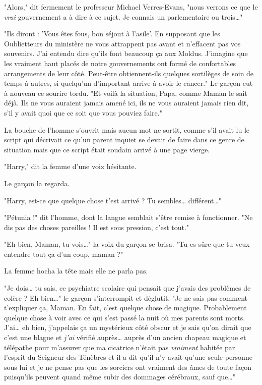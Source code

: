 "Alors," dit fermement le professeur Michael Verres-Evans, "nous verrons ce que le \emph{vrai}  gouvernement a à dire à ce sujet. Je connais un parlementaire ou trois…"

"Ils diront : 'Vous êtes fous, bon séjout à l'asile'. En supposant que les Oublietteurs du ministère ne vous attrappent pas avant et n'effacent pas vos souvenirs. J'ai entendu dire qu'ils font beaucoup ça aux Moldus. J'imagine que les vraiment haut placés de notre gouvernements ont formé de confortables arrangements de leur côté. Peut-être obtiennent-ils quelques sortilèges de soin de temps à autres, si quelqu'un d'important arrive à avoir le cancer." Le garçon eut à nouveau ce sourire tordu. "Et voilà la situation, Papa, comme Maman le sait déjà. Ils ne vous auraient jamais amené ici, ils ne vous auraient jamais rien dit, s'il y avait quoi que ce soit que vous pouviez faire."

La bouche de l'homme s'ouvrit mais aucun mot ne sortit, comme s'il avait lu le script qui décrivait ce qu'un parent inquiet se devait de faire dans ce genre de situation mais que ce script était soudain arrivé à une page vierge.

"Harry," dit la femme d'une voix hésitante.

Le garçon la regarda.

"Harry, est-ce que quelque chose t'est arrivé ? Tu sembles… différent…"

"Pétunia !" dit l'homme, dont la langue semblait s'être remise à fonctionner. "Ne dis pas des choses pareilles ! Il est sous pression, c'est tout."

"Eh bien, Maman, tu vois…" la voix du garçon se brisa. "Tu es sûre que tu veux entendre tout ça d'un coup, maman ?"

La femme hocha la tête mais elle ne parla pas.

"Je dois… tu sais, ce psychiatre scolaire qui pensait que j'avais des problèmes de colère ? Eh bien…" le garçon s'interrompit et déglutit. "Je ne sais pas comment t'expliquer ça, Maman. En fait, c'est quelque chose de magique. Probablement quelque chose à voir avec ce qui s'est passé la nuit où mes parents sont morts. J'ai… eh bien, j'appelais ça un mystérieux côté obscur et je sais qu'on dirait que c'est une blague et \emph{j'ai}  vérifié auprès… auprès d'un ancien chapeau magique et télépathe pour m'assurer que ma cicatrice n'était pas \emph{vraiment}  habitée par l'esprit du Seigneur des Ténèbres et il a dit qu'il n'y avait qu'une seule personne sous lui et je ne pense pas que les sorciers ont vraiment des âmes de toute façon puisqu'ils peuvent quand même subir des dommages cérébraux, sauf que…"

